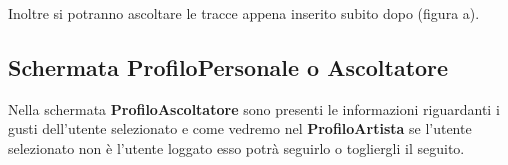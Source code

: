 \documentclass[11pt]{article}
\begin{document}
	Inoltre si potranno ascoltare le tracce appena inserito subito dopo (figura a).
	\begin{figure}[h]
		\centering
	\end{figure}

	\clearpage
	\subsection{Schermata ProfiloPersonale o Ascoltatore}

	Nella schermata \textbf{ProfiloAscoltatore} sono presenti le informazioni riguardanti i gusti dell'utente selezionato e come vedremo nel \textbf{ProfiloArtista} se l'utente selezionato non è 
	l'utente loggato esso potrà seguirlo o togliergli il seguito.
	\begin{figure}[h]
		\centering
	\end{figure}
\end{document}
